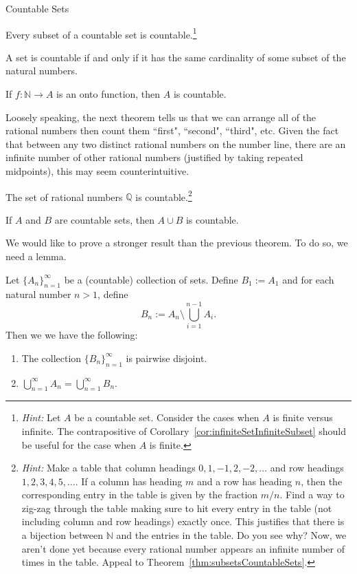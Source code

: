 \begin{section}{Countable Sets}
\begin{theorem}\label{thm:subsetsCountableSets}
Every subset of a countable set is countable.\footnote{\emph{Hint:} Let $A$ be a countable set.  Consider the cases when $A$ is finite versus infinite. The contrapositive of Corollary~\ref{cor:infiniteSetInfiniteSubset} should be useful for the case when $A$ is finite.}
\end{theorem}

\begin{theorem}
A set is countable if and only if it has the same cardinality of some subset of the natural numbers.
\end{theorem}

\begin{theorem}
If $f:\mathbb{N}\to A$ is an onto function, then $A$ is countable.
\end{theorem}

Loosely speaking, the next theorem tells us that we can arrange all of the rational numbers then count them ``first", ``second", ``third", etc. Given the fact that between any two distinct rational numbers on the number line, there are an infinite number of other rational numbers (justified by taking repeated midpoints), this may seem counterintuitive.  

\begin{theorem}
The set of rational numbers $\mathbb{Q}$ is countable.\footnote{\emph{Hint:} Make a table that column headings $0, 1, -1, 2,-2,\ldots$ and row headings $1,2,3,4,5,\ldots$.  If a column has heading $m$ and a row has heading $n$, then the corresponding entry in the table is given by the fraction $m/n$.  Find a way to zig-zag through the table making sure to hit every entry in the table (not including column and row headings) exactly once.  This justifies that there is a bijection between $\mathbb{N}$ and the entries in the table.  Do you see why?  Now, we aren't done yet because every rational number appears an infinite number of times in the table. Appeal to Theorem~\ref{thm:subsetsCountableSets}.}
\end{theorem}

\begin{theorem}
If $A$ and $B$ are countable sets, then $A\cup B$ is countable.
\end{theorem}

We would like to prove a stronger result than the previous theorem. To do so, we need a lemma.

\begin{lemma}
Let $\{A_n\}_{n=1}^{\infty}$ be a (countable) collection of sets. Define $B_1:=A_1$ and for each natural number $n>1$, define
\[
B_n:=A_n\setminus \bigcup_{i=1}^{n-1}A_i.
\]
Then we we have the following:
\begin{enumerate}[label=\textrm{(\alph*)}]
\item The collection $\{B_n\}_{n=1}^{\infty}$ is pairwise disjoint.
\item $\displaystyle \bigcup_{n=1}^{\infty}A_n =\bigcup_{n=1}^{\infty}B_n$.
\end{enumerate}
\end{lemma}


\end{section}
